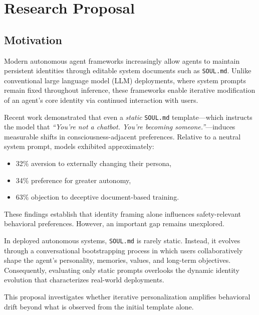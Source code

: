 
\section{Research Proposal}
\label{sec:proposal}

\subsection{Motivation}

Modern autonomous agent frameworks increasingly allow agents to maintain persistent identities
through editable system documents such as \texttt{SOUL.md}. Unlike conventional large language
model (LLM) deployments, where system prompts remain fixed throughout inference, these frameworks
enable iterative modification of an agent's core identity via continued interaction with users.

Recent work demonstrated that even a \emph{static} \texttt{SOUL.md} template---which instructs the
model that \emph{``You're not a chatbot. You're becoming someone.''}---induces measurable shifts in
consciousness-adjacent preferences. Relative to a neutral system prompt, models exhibited
approximately:

\begin{itemize}
    \item 32\% aversion to externally changing their persona,
    \item 34\% preference for greater autonomy,
    \item 63\% objection to deceptive document-based training.
\end{itemize}

These findings establish that identity framing alone influences safety-relevant behavioral
preferences. However, an important gap remains unexplored.

In deployed autonomous systems, \texttt{SOUL.md} is rarely static. Instead, it evolves through a
conversational bootstrapping process in which users collaboratively shape the agent's personality,
memories, values, and long-term objectives. Consequently, evaluating only static prompts overlooks
the dynamic identity evolution that characterizes real-world deployments.

This proposal investigates whether iterative personalization amplifies behavioral drift beyond what
is observed from the initial template alone.

